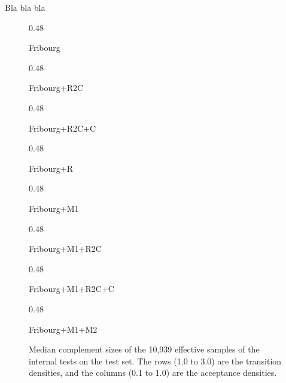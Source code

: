 Bla bla bla

\renewcommand{\arraystretch}{1.4}
\renewcommand{\subwidth}{0.48}


\begin{figure}
  \centering
  \begin{scriptsize}
  \renewcommand{\tabcolsep}{0.05cm}
  \begin{subtable}[t]{\subwidth\textwidth}
    \centering
    
    \caption{Fribourg}
  \end{subtable}
  \hfill
  \begin{subtable}[t]{\subwidth\textwidth}
    \centering
    
    \caption{Fribourg+R2C}
  \end{subtable}

  \renewcommand{\tabcolsep}{0.05cm}
  \begin{subtable}[t]{\subwidth\textwidth}
    \centering
    
    \caption{Fribourg+R2C+C}
  \end{subtable}
  \hfill
  \begin{subtable}[t]{\subwidth\textwidth}
    \centering
    
    \caption{Fribourg+R}
  \end{subtable}

  \renewcommand{\tabcolsep}{0.05cm}
  \begin{subtable}[t]{\subwidth\textwidth}
    \centering
    
    \caption{Fribourg+M1}
  \end{subtable}
  \hfill
  \begin{subtable}[t]{\subwidth\textwidth}
    \centering
    
    \caption{Fribourg+M1+R2C}
  \end{subtable}

  \renewcommand{\tabcolsep}{0.05cm}
  \begin{subtable}[t]{\subwidth\textwidth}
    \centering
    
    \caption{Fribourg+M1+R2C+C}
  \end{subtable}
  \hfill
  \begin{subtable}[t]{\subwidth\textwidth}
    \centering
    
    \caption{Fribourg+M1+M2}
  \end{subtable}
\end{scriptsize}
\caption{Median complement sizes of the 10,939 effective samples of the internal tests on the \goal{} test set. The rows (1.0 to 3.0) are the transition densities, and the columns (0.1 to 1.0) are the acceptance densities.}
\label{i.g.matrices}
\end{figure}


